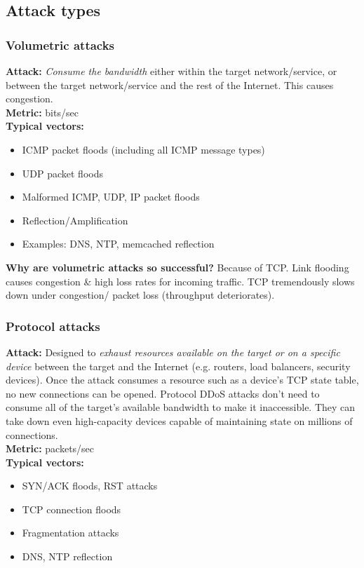 \documentclass[11pt,oneside,a4paper]{article}
\begin{document}
\subsection{Attack types}

\subsubsection{Volumetric attacks}

\textbf{Attack:} \textit{Consume the bandwidth} either within the target network/service, or between the target network/service and the rest of the Internet. This causes congestion.\\
\textbf{Metric:} bits/sec\\
\textbf{Typical vectors:}
\vspace{-\topsep}
\begin{itemize}
	\setlength{\itemsep}{0pt}
	\setlength{\parskip}{0pt}
	\item ICMP packet floods (including all ICMP message types)
	\item UDP packet floods
	\item Malformed ICMP, UDP, IP packet floods
	\item Reflection/Amplification
	\item Examples: DNS, NTP, memcached reflection
\end{itemize}
\vspace{-\topsep}

\textbf{Why are volumetric attacks so successful?} Because of TCP. Link flooding causes congestion \& high loss rates for incoming traffic. TCP tremendously slows down under congestion/ packet loss (throughput deteriorates).

\subsubsection{Protocol attacks}

\textbf{Attack:} Designed to \textit{exhaust resources available on the target or on a specific device} between the target and the Internet (e.g. routers, load balancers, security devices). Once the attack consumes a resource such as a device’s TCP state table, no new connections can be opened. Protocol DDoS attacks don't need to consume all of the target’s available bandwidth to make it inaccessible. They can take down even high-capacity devices capable of maintaining state on millions of connections.\\
\textbf{Metric:} packets/sec\\
\textbf{Typical vectors:}
\vspace{-\topsep}
\begin{itemize}
	\setlength{\itemsep}{0pt}
	\setlength{\parskip}{0pt}
	\item SYN/ACK floods, RST attacks
	\item TCP connection floods
	\item Fragmentation attacks
	\item DNS, NTP reflection
\end{itemize}
\vspace{-\topsep}
\end{document}
